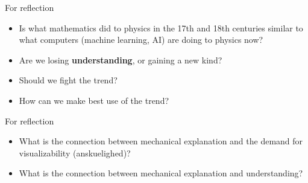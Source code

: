 \documentclass[fleqn]{beamer}
\newcommand{\kw}[1]{\textbf{#1}}
\begin{document}
\begin{frame}{For reflection}

  \begin{itemize}
  \item Is what mathematics did to physics in the 17th and 18th
    centuries similar to what computers (machine learning, AI) are
    doing to physics now?
  \item Are we losing \kw{understanding}, or gaining a new kind?
  \item Should we fight the trend?
  \item How can we make best use of the trend?
  \end{itemize}

\end{frame}

\begin{frame}{For reflection}

  \begin{itemize}
  \item What is the connection between mechanical explanation and the
    demand for visualizability (anskuelighed)?
  \item What is the connection between mechanical explanation and
    understanding?
  \end{itemize}

\end{frame}
\end{document}
